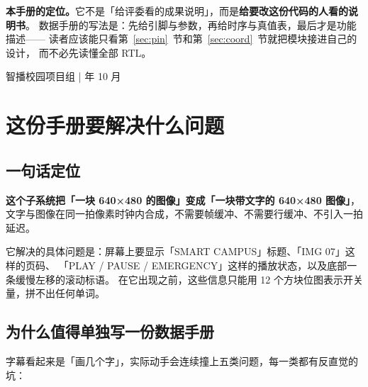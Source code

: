 \documentclass[10pt,a4paper]{article}
\begin{document}
\begin{titlepage}
\vfill
\begin{tcolorbox}[enhanced,colback=dsaccent!4,colframe=dsaccent!30,boxrule=0.4pt,arc=1pt,left=8pt,right=8pt,top=5pt,bottom=5pt]
{\footnotesize\color{dsink}
\textbf{本手册的定位。}它不是「给评委看的成果说明」，而是\textbf{给要改这份代码的人看的说明书}。
数据手册的写法是：先给引脚与参数，再给时序与真值表，最后才是功能描述——
读者应该能只看第~\ref{sec:pin}~节和第~\ref{sec:coord}~节就把模块接进自己的设计，
而不必先读懂全部 RTL。}
\end{tcolorbox}

\vspace{6mm}
{\footnotesize\color{dsdim}\sffamily
智播校园项目组 \quad| 年 10 月}
\end{titlepage}

\tableofcontents
\clearpage

\setcounter{page}{1}

\section{这份手册要解决什么问题}

\subsection{一句话定位}

\textbf{这个子系统把「一块 640×480 的图像」变成「一块带文字的 640×480 图像」}，
文字与图像在同一拍像素时钟内合成，不需要帧缓冲、不需要行缓冲、不引入一拍延迟。

它解决的具体问题是：屏幕上要显示「SMART CAMPUS」标题、「IMG 07」这样的页码、
「PLAY / PAUSE / EMERGENCY」这样的播放状态，以及底部一条缓慢左移的滚动标语。
在它出现之前，这些信息只能用 12 个方块位图表示开关量，拼不出任何单词。

\subsection{为什么值得单独写一份数据手册}

字幕看起来是「画几个字」，实际动手会连续撞上五类问题，每一类都有反直觉的坑：
\end{document}
